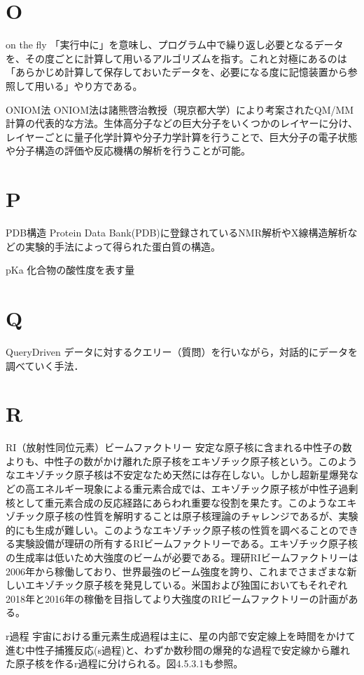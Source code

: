 \begin{用語集}
\section{O}
\item{on the fly}{}
{「実行中に」を意味し、プログラム中で繰り返し必要となるデータを、その度ごとに計算して用いるアルゴリズムを指す。これと対極にあるのは「あらかじめ計算して保存しておいたデータを、必要になる度に記憶装置から参照して用いる」やり方である。}
\item{ONIOM法}{}
{ONIOM法は諸熊啓治教授（現京都大学）により考案されたQM/MM計算の代表的な方法。生体高分子などの巨大分子をいくつかのレイヤーに分け、レイヤーごとに量子化学計算や分子力学計算を行うことで、巨大分子の電子状態や分子構造の評価や反応機構の解析を行うことが可能。}
\section{P}
\item{PDB構造}{}
{Protein Data Bank(PDB)に登録されているNMR解析やX線構造解析などの実験的手法によって得られた蛋白質の構造。}
\item{pKa}{}
{化合物の酸性度を表す量}
\section{Q}
\item{QueryDriven}{}
{データに対するクエリー（質問）を行いながら，対話的にデータを調べていく手法．}
\section{R}
\item{RI（放射性同位元素）ビームファクトリー}{}
{安定な原子核に含まれる中性子の数よりも、中性子の数がかけ離れた原子核をエキゾチック原子核という。このようなエキゾチック原子核は不安定なため天然には存在しない。しかし超新星爆発などの高エネルギー現象による重元素合成では、エキゾチック原子核が中性子過剰核として重元素合成の反応経路にあらわれ重要な役割を果たす。このようなエキゾチック原子核の性質を解明することは原子核理論のチャレンジであるが、実験的にも生成が難しい。このようなエキゾチック原子核の性質を調べることのできる実験設備が理研の所有するRIビームファクトリーである。エキゾチック原子核の生成率は低いため大強度のビームが必要である。理研RIビームファクトリーは2006年から稼働しており、世界最強のビーム強度を誇り、これまでさまざまな新しいエキゾチック原子核を発見している。米国および独国においてもそれぞれ2018年と2016年の稼働を目指してより大強度のRIビームファクトリーの計画がある。}
\item{r過程}{}
{宇宙における重元素生成過程は主に、星の内部で安定線上を時間をかけて進む中性子捕獲反応(s過程)と、わずか数秒間の爆発的な過程で安定線から離れた原子核を作るr過程に分けられる。図4.5.3.1も参照。}

\end{用語集}
